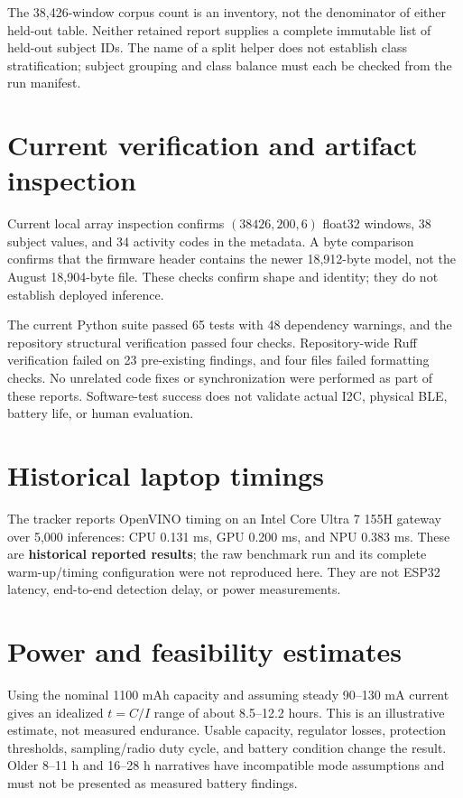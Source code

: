 The 38,426-window corpus count is an inventory, not the denominator of either held-out table. Neither retained report supplies a complete immutable list of held-out subject IDs. The name of a split helper does not establish class stratification; subject grouping and class balance must each be checked from the run manifest.

\section{Current verification and artifact inspection}
Current local array inspection confirms $(38426,200,6)$ float32 windows, 38 subject values, and 34 activity codes in the metadata. A byte comparison confirms that the firmware header contains the newer 18,912-byte model, not the August 18,904-byte file. These checks confirm shape and identity; they do not establish deployed inference.

The current Python suite passed 65 tests with 48 dependency warnings, and the repository structural verification passed four checks. Repository-wide Ruff verification failed on 23 pre-existing findings, and four files failed formatting checks. No unrelated code fixes or synchronization were performed as part of these reports. Software-test success does not validate actual I2C, physical BLE, battery life, or human evaluation.

\section{Historical laptop timings}
The tracker reports OpenVINO timing on an Intel Core Ultra 7 155H gateway over 5,000 inferences: CPU 0.131 ms, GPU 0.200 ms, and NPU 0.383 ms. These are \textbf{historical reported results}; the raw benchmark run and its complete warm-up/timing configuration were not reproduced here. They are not ESP32 latency, end-to-end detection delay, or power measurements.

\section{Power and feasibility estimates}
Using the nominal 1100 mAh capacity and assuming steady 90--130 mA current gives an idealized $t=C/I$ range of about 8.5--12.2 hours. This is an illustrative estimate, not measured endurance. Usable capacity, regulator losses, protection thresholds, sampling/radio duty cycle, and battery condition change the result. Older 8--11 h and 16--28 h narratives have incompatible mode assumptions and must not be presented as measured battery findings.

